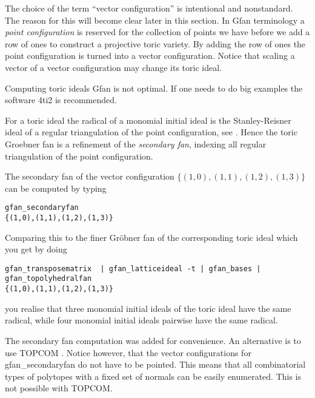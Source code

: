 The choice of the term ``vector configuration'' is intentional and nonstandard. The reason for this will become clear later in this section. In Gfan terminology a \emph{point configuration} is reserved for the collection of points we have before we add a row of ones to construct a projective toric variety. By adding the row of ones the point configuration is turned into a vector configuration.
Notice that scaling a vector of a vector configuration may change its toric ideal.

Computing toric ideals Gfan is not optimal. If one needs to do big examples the software 4ti2 \cite{4ti2} is recommended.

For a toric ideal the radical of a monomial initial ideal is the Stanley-Reisner ideal of a regular triangulation of the point configuration, see \cite{sturmfels}. Hence the toric Groebner fan is a refinement of the \emph{secondary fan}, indexing all regular triangulation of the point configuration.

The secondary fan of the vector configuration $\{(1,0),(1,1),(1,2),(1,3)\}$ can be computed by typing
\begin{verbatim}
gfan_secondaryfan
{(1,0),(1,1),(1,2),(1,3)}
\end{verbatim}
Comparing this to the finer Gr\"obner fan of the corresponding toric ideal which you get by doing
\begin{footnotesize}
\begin{verbatim}
gfan_transposematrix  | gfan_latticeideal -t | gfan_bases | gfan_topolyhedralfan 
{(1,0),(1,1),(1,2),(1,3)}
\end{verbatim}
\end{footnotesize}
you realise that three monomial initial ideals of the toric ideal have the same radical, while four monomial initial ideals pairwise have the same radical.

The secondary fan computation was added for convenience.
An alternative is to use
TOPCOM \cite{rambau}.  Notice however, that the vector configurations
for gfan\_secondaryfan do not have to be pointed. This means that
all combinatorial types of polytopes with a fixed set of normals can
be easily enumerated. This is not possible with TOPCOM.
